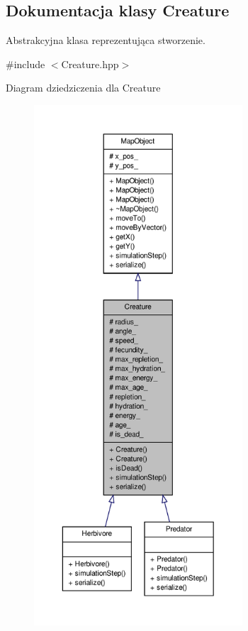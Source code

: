 \hypertarget{classCreature}{\subsection{Dokumentacja klasy Creature}
\label{classCreature}
}


Abstrakcyjna klasa reprezentująca stworzenie.  




{\ttfamily \#include $<$Creature.\-hpp$>$}



Diagram dziedziczenia dla Creature
\nopagebreak
\begin{figure}[H]
\begin{center}
\leavevmode
\includegraphics[height=550pt]{classCreature__inherit__graph}
\end{center}
\end{figure}


